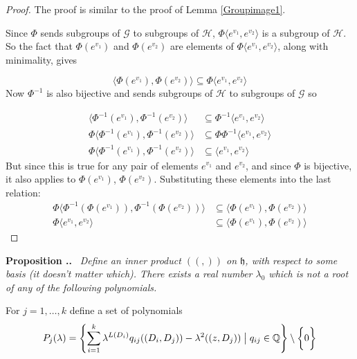 \documentclass[honours]{UNSWthesis}
\newcommand{\Q}{\mathbb{Q}}
\newcommand{\G}{\mathcal{G}}
\newcommand{\1}{\mathbf{e}_{1}}
\newcommand{\2}{\mathbf{e}_{3}}
\newcommand{\3}{\mathbf{e}_{3}}
\newcounter{Item}[section]
\newenvironment{Proposition}{\medskip
                            \refstepcounter{Item}
                            \noindent
                           {\bf Proposition \thesection.\theItem.}\ %
                            \begingroup \sl}
                           {\endgroup\medskip}
\begin{document}
\begin{proof}

The proof is similar to the proof of Lemma \ref{Groupimage1}.

Since $\Phi$ sends subgroups of $\G$ to subgroups of $\mathcal{H}$, $\Phi \langle e^{v_{1}},e^{v_{2}} \rangle$ is a subgroup of $\mathcal{H}$. So the fact that $\Phi(e^{v_{1}})$ and $\Phi(e^{v_{2}})$ are elements of $\Phi \langle e^{v_{1}},e^{v_{2}} \rangle$, along with minimality, gives

\[
\langle \Phi(e^{v_{1}}), \Phi(e^{v_{2}}) \rangle \subseteq \Phi \langle e^{v_{1}},e^{v_{2}} \rangle  
\]
Now $\Phi^{-1}$ is also bijective and sends subgroups of $\mathcal{H}$ to subgroups of $\G$ so

\begin{align*}
\langle \Phi^{-1}(e^{v_{1}}), \Phi^{-1}(e^{v_{2}}) \rangle &\subseteq \Phi^{-1} \langle e^{v_{1}},e^{v_{2}} \rangle  \\
\Phi \langle \Phi^{-1}(e^{v_{1}}), \Phi^{-1}(e^{v_{2}}) \rangle &\subseteq \Phi\Phi^{-1} \langle e^{v_{1}},e^{v_{2}} \rangle  \\
\Phi \langle \Phi^{-1}(e^{v_{1}}), \Phi^{-1}(e^{v_{2}}) \rangle &\subseteq  \langle e^{v_{1}},e^{v_{2}} \rangle  
\end{align*}
But since this is true for any pair of elements $e^{v_{1}}$ and $e^{v_{2}}$, and since $\Phi$ is bijective, it also applies to $\Phi(e^{v_{1}})$, $\Phi(e^{v_{2}})$. Substituting these elements into the last relation:
\begin{align*}
\Phi \langle \Phi^{-1}(\Phi(e^{v_{1}})), \Phi^{-1}(\Phi(e^{v_{2}})) \rangle &\subseteq  \langle \Phi(e^{v_{1}}),\Phi(e^{v_{2}}) \rangle \\
\Phi \langle e^{v_{1}}, e^{v_{2}} \rangle &\subseteq  \langle \Phi(e^{v_{1}}),\Phi(e^{v_{2}}) \rangle
\end{align*}

\end{proof}

\begin{Proposition}\label{Polysets}
Define an inner product $((,))$ on $ \mathfrak{h}$, with respect to some basis (it doesn't matter which). There exists a real number $\lambda_0$ which is not a root of any of the following polynomials. 

For $j=1,\ldots,k$ define a set of polynomials
\[
P_j(\lambda)= \left\lbrace \sum\limits_{i=1}^{k} \lambda^{L(D_i)} q_{ij} ((D_i,D_j)) - \lambda^2 ((z,D_j)) \bigm| q_{ij} \in \Q \right\rbrace \setminus \bigg\{ 0 \bigg\}
\]
\end{Proposition}
\end{document}

